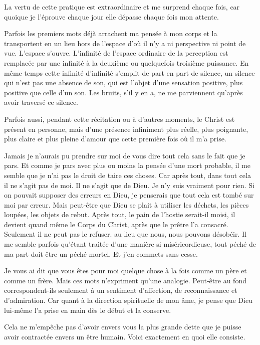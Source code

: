 \documentclass[french,twoside]{book} %
\begin{document}
La vertu de cette pratique est extraordinaire et me surprend chaque fois, car quoique je l'éprouve chaque jour elle dépasse chaque fois mon attente.\par
Parfois les premiers mots déjà arrachent ma pensée à mon corps et la transportent en un lieu hors de l'espace d'où il n'y a ni perspective ni point de vue. L'espace s'ouvre. L'infinité de l'espace ordinaire de la perception est remplacée par une infinité à la deuxième ou quelquefois troisième puissance. En même temps cette infinité d'infinité s'emplit de part en part de silence, un silence qui n'est pas une absence de son, qui est l'objet d'une sensation positive, plus positive que celle d'un son. Les bruits, s'il y en a, ne me parviennent qu'après avoir traversé ce silence.\par
Parfois aussi, pendant cette récitation ou à d'autres moments, le Christ est présent en personne, mais d'une présence infiniment plus réelle, plus poignante, plus claire et plus pleine d'amour que cette première fois où il m'a prise.\par
Jamais je n'aurais pu prendre sur moi de vous dire tout cela sans le fait que je pars. Et comme je pars avec plus ou moins la pensée d'une mort probable, il me semble que je n'ai pas le droit de taire ces choses. Car après tout, dans tout cela il ne s'agit pas de moi. Il ne s'agit que de Dieu. Je n'y suis vraiment pour rien. Si on pouvait supposer des erreurs en Dieu, je penserais que tout cela est tombé sur moi par erreur. Mais peut-être que Dieu se plait à utiliser les déchets, les pièces loupées, les objets de rebut. Après tout, le pain de l'hostie serait-il moisi, il devient quand même le Corps du Christ, après que le prêtre l'a consacré. Seulement il ne peut pas le refuser. au lieu que nous, nous pouvons désobéir. Il me semble parfois qu'étant traitée d'une manière si miséricordieuse, tout péché de ma part doit être un péché mortel. Et j'en commets sans cesse.\par
Je vous ai dit que vous êtes pour moi quelque chose à la fois comme un père et comme un frère. Mais ces mots n'expriment qu'une analogie. Peut-être au fond correspondent-ils seulement à un sentiment d'affection, de reconnaissance et d'admiration. Car quant à la direction spirituelle de mon âme, je pense que Dieu lui-même l'a prise en main dès le début et la conserve.\par
Cela ne m'empêche pas d'avoir envers vous la plus grande dette que je puisse avoir contractée envers un être humain. Voici exactement en quoi elle consiste.\par
\end{document}
